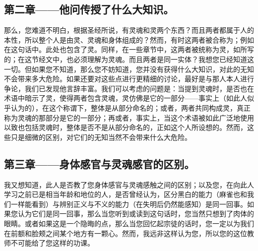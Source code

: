 
\subsection{第二章——他问传授了什么大知识。}

那么，您难道不明白，根据圣经所说，有灵魂和灵两个东西？而且两者都属于人的本性，所以整个人是由灵、灵魂和身体组成的？然而，有时这两者被合称为；例如在这句话中。此处也包含了灵。同样，在一些章节中，这两者被统称为灵，如所写的；在这节经文中，也必须理解为灵魂。而且两者是同一实体？我想您已经知道这一切。但如果您不知道，那么您不妨知道，您并没有获得什么大知识，对此的无知不会带来多大危险。如果还要对这些点进行更精细的讨论，最好是与那人本人进行争论，我们已发现他言辞丰富。我们可以考虑的问题是：当提到灵魂时，是否也在术语中暗示了灵，使得两者包含灵魂，灵仿佛是它的一部分——事实上（如此人似乎认为的），在这个称谓下，整体是从部分命名的；或者，两者共同构成灵，真正称为灵魂的那部分是它的一部分；再或者，事实上，当这个术语被如此广泛地使用以致也包括灵魂时，整体是否不是从部分命名的，正如这个人所设想的。然而，这些只是细微的区别，对它们的无知当然不会带来什么大危险。\par


\subsection{第三章——身体感官与灵魂感官的区别。}

我又想知道，此人是否教了您身体感官与灵魂感触之间的区别；以及您，在向此人学习之前已是相当年龄和地位的人，是否曾经认为，区分黑白的能力（麻雀也和我们一样能看到）与辨别正义与不义的能力（在失明后仍然能感知）是同一回事。如果您认为它们是同一回事，那么当您听到或读到这句话时，您当然只想到了肉体的眼睛。或者如果这是一个隐晦的点，那么当您回忆起宗徒的话时，您一定以为我们在前额和脸颊之间某个地方有一颗心。然而，我远非这样认为您，所以您的这位教师不可能给了您这样的功课。\par


